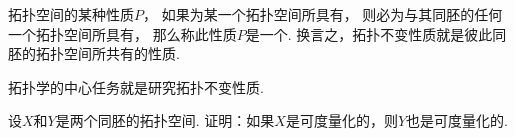 拓扑空间的某种性质\(P\)，
如果为某一个拓扑空间所具有，
则必为与其同胚的任何一个拓扑空间所具有，
那么称此性质\(P\)是一个.
换言之，拓扑不变性质就是彼此同胚的拓扑空间所共有的性质.

\begin{remark}
{\color{red} 拓扑学的中心任务就是研究拓扑不变性质.}
\end{remark}

\begin{example}
设\(X\)和\(Y\)是两个同胚的拓扑空间.
证明：如果\(X\)是可度量化的，则\(Y\)也是可度量化的.
\end{example}
